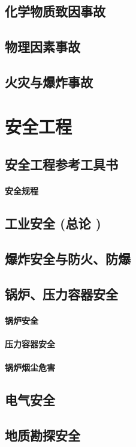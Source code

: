 \documentclass[UTF8]{../ApplicationUniverse}
\begin{document}
\section{化学物质致因事故}
\section{物理因素事故}
\section{火灾与爆炸事故}





\chapter{安全工程}
\section{安全工程参考工具书}
    \subsubsection{安全规程}
\section{工业安全 (总论 )}
\section{爆炸安全与防火、防爆}
\section{锅炉、压力容器安全}
    \subsubsection{锅炉安全}
    \subsubsection{压力容器安全}
    \subsubsection{锅炉烟尘危害}
\section{电气安全}
\section{地质勘探安全}
\end{document}
